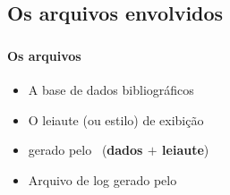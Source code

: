 \documentclass[handout,10pt]{beamer}
\begin{document}
{\newsavebox{\blgbox}
	
\subsection{Os arquivos envolvidos}
\begin{frame}
	\frametitle{\bibtex}
	\framesubtitle{Os arquivos}
	
	\begin{flushright}
		\onslide<2>{\llap{\usebox{\bstbox}}}%
		\onslide<3>{\llap{\usebox{\bblbox}}}%
		\onslide<4->{\llap{\usebox{\blgbox}}}%
	\end{flushright}
	
	\begin{itemize}
		\item<1->[\texttt{bib}] \alert<1>{A base de dados bibliográficos}
		\item<2->[\texttt{bst}] \alert<2>{O leiaute (ou estilo) de exibição}
		\item<3->[\texttt{bbl}] \alert<3>{ gerado pelo
			\bibtex\ (\textbf{dados $+$ leiaute})}
		\item<4->[\texttt{blg}] \alert<4>{Arquivo de log gerado pelo \bibtex}
	\end{itemize}
\end{frame}
}
\end{document}

